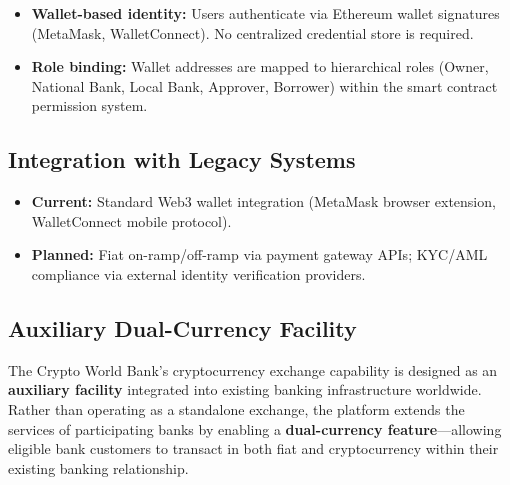 \documentclass[11pt,a4paper]{article}
\begin{document}
\begin{itemize}[noitemsep]
\item \textbf{Wallet-based identity:} Users authenticate via Ethereum wallet signatures (MetaMask, WalletConnect). No centralized credential store is required.
\item \textbf{Role binding:} Wallet addresses are mapped to hierarchical roles (Owner, National Bank, Local Bank, Approver, Borrower) within the smart contract permission system.
\end{itemize}

\subsection{Integration with Legacy Systems}

\begin{itemize}[noitemsep]
\item \textbf{Current:} Standard Web3 wallet integration (MetaMask browser extension, WalletConnect mobile protocol).
\item \textbf{Planned:} Fiat on-ramp/off-ramp via payment gateway APIs; KYC/AML compliance via external identity verification providers.
\end{itemize}

\subsection{Auxiliary Dual-Currency Facility}

The Crypto World Bank's cryptocurrency exchange capability is designed as an \textbf{auxiliary facility} integrated into existing banking infrastructure worldwide. Rather than operating as a standalone exchange, the platform extends the services of participating banks by enabling a \textbf{dual-currency feature}---allowing eligible bank customers to transact in both fiat and cryptocurrency within their existing banking relationship.
\end{document}

